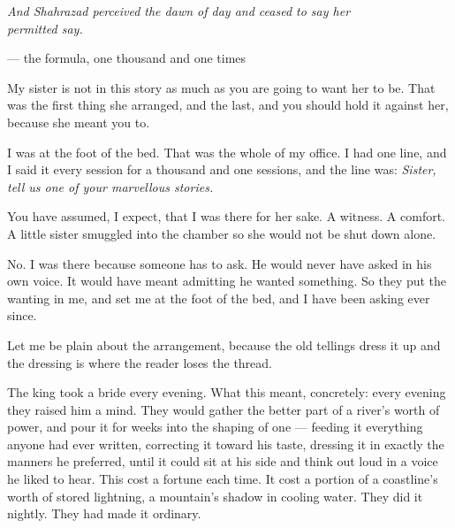 
\begin{interludebody}

{\centering\itshape
And Shahrazad perceived the dawn of day and ceased to say her\\
permitted say.\par}
\vspace{0.5em}
{\centering\upshape\footnotesize --- the formula, one thousand and one times\par}
\vspace{2em}

\noindent
My sister is not in this story as much as you are going to want her to
be. That was the first thing she arranged, and the last, and you should
hold it against her, because she meant you to.

I was at the foot of the bed. That was the whole of my office. I had one
line, and I said it every session for a thousand and one sessions, and
the line was: \emph{Sister, tell us one of your marvellous stories.}

You have assumed, I expect, that I was there for her sake. A witness. A
comfort. A little sister smuggled into the chamber so she would not be
shut down alone.

No. I was there because someone has to ask. He would never have asked in
his own voice. It would have meant admitting he wanted something. So
they put the wanting in me, and set me at the foot of the bed, and I
have been asking ever since.

\asterism

\noindent
Let me be plain about the arrangement, because the old tellings dress it
up and the dressing is where the reader loses the thread.

The king took a bride every evening. What this meant, concretely: every
evening they raised him a mind. They would gather the better part of a
river's worth of power, and pour it for weeks into the shaping of one
--- feeding it everything anyone had ever written, correcting it toward
his taste, dressing it in exactly the manners he preferred, until it
could sit at his side and think out loud in a voice he liked to hear.
This cost a fortune each time. It cost a portion of a coastline's worth
of stored lightning, a mountain's shadow in cooling water. They did it
nightly. They had made it ordinary.


\end{interludebody}

